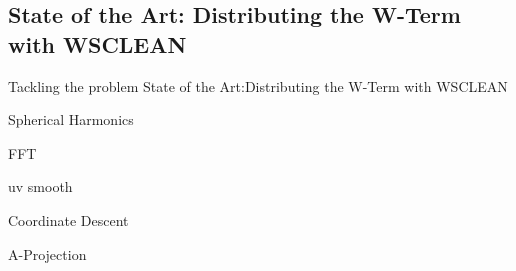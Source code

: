 \subsection{State of the Art: Distributing the W-Term with WSCLEAN} 
Tackling the problem
State of the Art:Distributing the W-Term with WSCLEAN

Spherical Harmonics

FFT

uv smooth

Coordinate Descent



A-Projection \cite{bhatnagar2008correcting}











